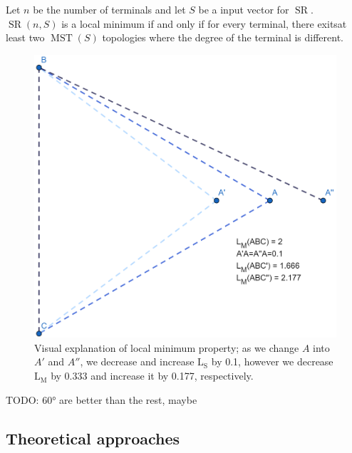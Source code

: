 \documentclass{mpaper}
\begin{document}
\begin{conjecture}
  Let $n$ be the number of terminals and let $S$ be a input vector for $\operatorname{SR}$. $\operatorname{SR}(n, S)$ is a local minimum if and only if for every terminal, there exitsat least two $\operatorname{MST}(S)$ topologies where the degree of the terminal is different.
\end{conjecture}

\begin{figure}[h!]
  \begin{center}
  \includegraphics[scale=1.3]{plot9.png}
  \end{center}
  \caption{\label{fig:10}Visual explanation of local minimum property; as we change $A$ into $A'$ and $A''$, we decrease and increase $\operatorname{L_S}$ by 0.1, however we decrease $\operatorname{L_M}$ by 0.333 and increase it by 0.177, respectively.}
\end{figure}

TODO: 60° are better than the rest, maybe
\subsection{Theoretical approaches}
\end{document}
